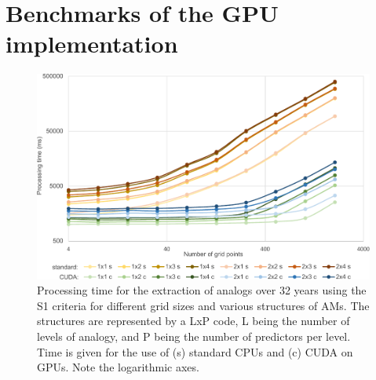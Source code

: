 \documentclass[draft]{agujournal2019}
\begin{document}
%
%



%
%

\FloatBarrier

\appendix

\section{Benchmarks of the GPU implementation}

\begin{figure}
	\noindent\includegraphics[width=130mm]{figures/cuda-timing.pdf}
	\caption{Processing time for the extraction of analogs over 32 years using the S1 criteria for different grid sizes and various structures of AMs. The structures are represented by a LxP code, L being the number of levels of analogy, and P being the number of predictors per level. Time is given for the use of (s) standard CPUs and (c) CUDA on GPUs. Note the logarithmic axes.}
	\label{cuda}
\end{figure}
\end{document}
